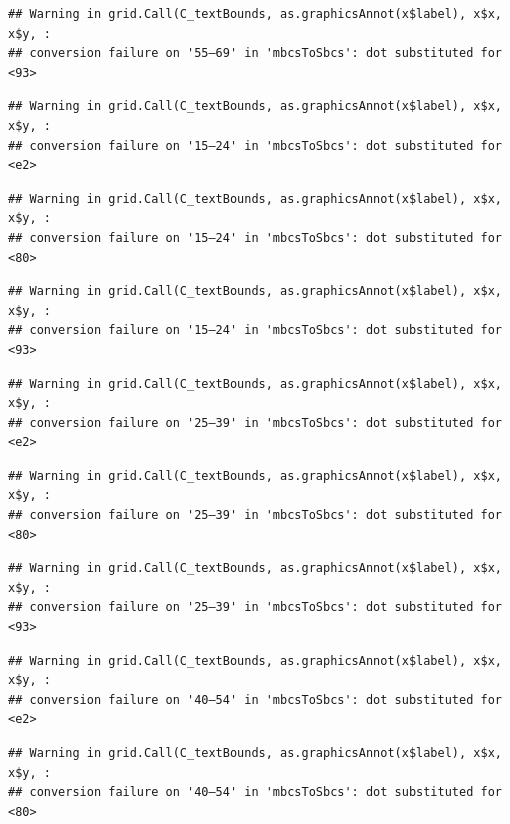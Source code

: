 \documentclass[
]{article}
\begin{document}
\begin{verbatim}
## Warning in grid.Call(C_textBounds, as.graphicsAnnot(x$label), x$x, x$y, :
## conversion failure on '55–69' in 'mbcsToSbcs': dot substituted for <93>
\end{verbatim}

\begin{verbatim}
## Warning in grid.Call(C_textBounds, as.graphicsAnnot(x$label), x$x, x$y, :
## conversion failure on '15–24' in 'mbcsToSbcs': dot substituted for <e2>
\end{verbatim}

\begin{verbatim}
## Warning in grid.Call(C_textBounds, as.graphicsAnnot(x$label), x$x, x$y, :
## conversion failure on '15–24' in 'mbcsToSbcs': dot substituted for <80>
\end{verbatim}

\begin{verbatim}
## Warning in grid.Call(C_textBounds, as.graphicsAnnot(x$label), x$x, x$y, :
## conversion failure on '15–24' in 'mbcsToSbcs': dot substituted for <93>
\end{verbatim}

\begin{verbatim}
## Warning in grid.Call(C_textBounds, as.graphicsAnnot(x$label), x$x, x$y, :
## conversion failure on '25–39' in 'mbcsToSbcs': dot substituted for <e2>
\end{verbatim}

\begin{verbatim}
## Warning in grid.Call(C_textBounds, as.graphicsAnnot(x$label), x$x, x$y, :
## conversion failure on '25–39' in 'mbcsToSbcs': dot substituted for <80>
\end{verbatim}

\begin{verbatim}
## Warning in grid.Call(C_textBounds, as.graphicsAnnot(x$label), x$x, x$y, :
## conversion failure on '25–39' in 'mbcsToSbcs': dot substituted for <93>
\end{verbatim}

\begin{verbatim}
## Warning in grid.Call(C_textBounds, as.graphicsAnnot(x$label), x$x, x$y, :
## conversion failure on '40–54' in 'mbcsToSbcs': dot substituted for <e2>
\end{verbatim}

\begin{verbatim}
## Warning in grid.Call(C_textBounds, as.graphicsAnnot(x$label), x$x, x$y, :
## conversion failure on '40–54' in 'mbcsToSbcs': dot substituted for <80>
\end{verbatim}
\end{document}
